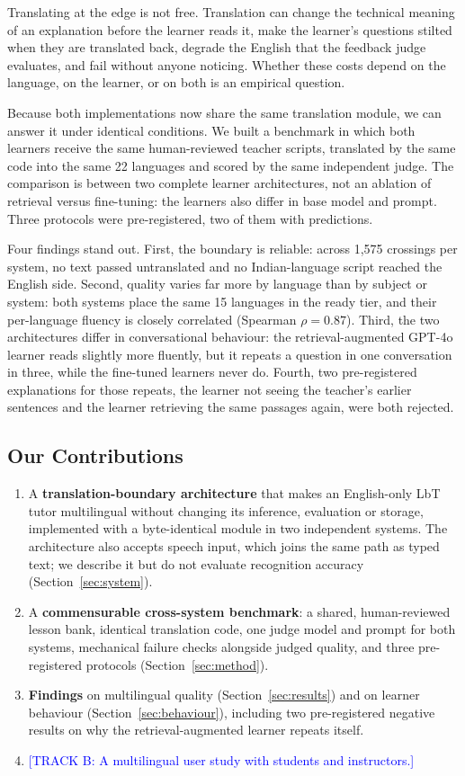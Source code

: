 \documentclass[pdflatex,sn-mathphys-num]{sn-jnl}%
\newcommand{\trackb}[1]{\textcolor{blue}{[TRACK B: #1]}}
\theoremstyle{thmstyleone}%
\theoremstyle{thmstyletwo}%
\theoremstyle{thmstylethree}%
\begin{document}
Translating at the edge is not free. Translation can change the technical meaning of an explanation
before the learner reads it, make the learner's questions stilted when they are translated back,
degrade the English that the feedback judge evaluates, and fail without anyone noticing. Whether
these costs depend on the language, on the learner, or on both is an empirical question.

Because both implementations now share the same translation module, we can answer it under
identical conditions. We built a benchmark in which both learners receive the same human-reviewed
teacher scripts, translated by the same code into the same 22 languages and scored by the same
independent judge. The comparison is between two complete learner architectures, not an ablation of
retrieval versus fine-tuning: the learners also differ in base model and prompt. Three protocols were
pre-registered, two of them with predictions.

Four findings stand out. First, the boundary is reliable: across 1,575 crossings per system, no text
passed untranslated and no Indian-language script reached the English side. Second, quality varies
far more by language than by subject or system: both systems place the same 15 languages in the
ready tier, and their per-language fluency is closely correlated (Spearman $\rho = 0.87$). Third,
the two architectures differ in conversational behaviour: the retrieval-augmented GPT-4o learner
reads slightly more fluently, but it repeats a question in one conversation in three, while the
fine-tuned learners never do. Fourth, two pre-registered explanations for those repeats, the
learner not seeing the teacher's earlier sentences and the learner retrieving the same passages
again, were both rejected.

\subsection{Our Contributions}\label{sec:contributions}

\begin{enumerate}
\item A \textbf{translation-boundary architecture} that makes an English-only LbT tutor multilingual
without changing its inference, evaluation or storage, implemented with a byte-identical module in two
independent systems. The architecture also accepts speech input, which joins the same path as typed
text; we describe it but do not evaluate recognition accuracy (Section~\ref{sec:system}).
\item A \textbf{commensurable cross-system benchmark}: a shared, human-reviewed lesson bank, identical
translation code, one judge model and prompt for both systems, mechanical failure checks alongside
judged quality, and three pre-registered protocols (Section~\ref{sec:method}).
\item \textbf{Findings} on multilingual quality (Section~\ref{sec:results}) and on learner behaviour
(Section~\ref{sec:behaviour}), including two pre-registered negative results on why the
retrieval-augmented learner repeats itself.
\item \trackb{A multilingual user study with students and instructors.}
\end{enumerate}
\end{document}
